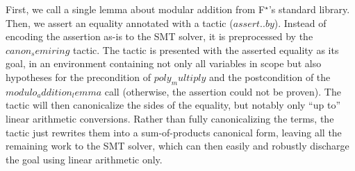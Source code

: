 \documentclass[runningheads]{llncs}
\newcommand\fstar{F$^\star$\xspace}
\newcommand{\comm}[3]{\ifcheckpagebudget\else\ifdraft{{\color{#1}[#2: #3]}}\fi\fi}
\newcommand{\ch}[1]{\comm{teal}{CH}{#1}}
\begin{document}
First, we call a single lemma about modular addition from \fstar's
standard library.
%
Then, we assert an equality annotated with a tactic (\ls$assert..by$).
%
Instead of encoding the assertion as-is to the SMT solver,
it is preprocessed by the \ls$canon_semiring$ tactic.
%
The tactic is presented with the asserted equality as its
goal, in an environment containing not only all variables in scope
but also hypotheses for the precondition of \ls$poly_multiply$
and the postcondition of the \ls$modulo_addition_lemma$ call
(otherwise, the assertion could not be proven).
%
The tactic will then canonicalize the sides of the equality, but notably
only ``up to'' linear arithmetic conversions.
%
Rather than fully canonicalizing the terms, the tactic just rewrites them
into a sum-of-products canonical form, leaving all the remaining
work to the SMT solver,
which can then easily and robustly discharge the
goal using linear arithmetic only.
\end{document}
